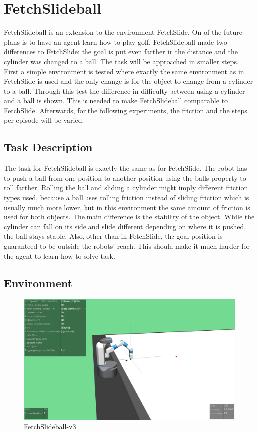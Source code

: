 \section{FetchSlideball}

FetchSlideball is an extension to the environment FetchSlide. On of the future plans is to have an agent learn how to play golf. FetchSlideball made two differences to FetchSlide: the goal is put even farther in the distance and the cylinder was changed to a ball.
The task will be approached in smaller steps. 
First a simple environment is tested where exactly the same environment as in FetchSlide is used and the only change is for the object to change from a cylinder to a ball. Through this test the difference in difficulty between using a cylinder and a ball is shown. This is needed to make FetchSlideball comparable to FetchSlide. 
Afterwards, for the following experiments, the friction and the steps per episode will be varied. 

\subsection{Task Description}

The task for FetchSlideball is exactly the same as for FetchSlide. The robot has to push a ball from one position to another position using the balls property to roll farther. Rolling the ball and sliding a cylinder might imply different friction types used, because a ball uses rolling friction instead of sliding friction which is usually much more lower, but in this environment the same amount of friction is used for both objects. The main difference is the stability of the object. While the cylinder can fall on its side and slide different depending on where it is pushed, the ball stays stable. 
Also, other than in FetchSlide, the goal position is guaranteed to be outside the robots' reach. This should make it much harder for the agent to learn how to solve task.


\subsection{Environment}

\begin{figure} [h]
	
	\centering
	\includegraphics[width=1\textwidth]{figures/FetchSlideball-v3.png}
	\caption{FetchSlideball-v3}
	
\end{figure}

